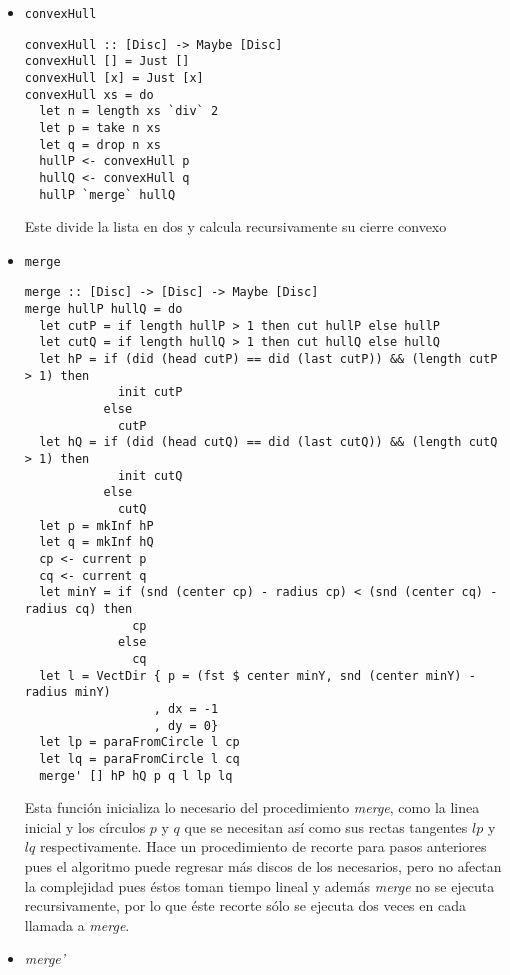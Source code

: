 \documentclass[12pt]{article}
\begin{document}
\begin{itemize}
\item \texttt{convexHull}

  \begin{verbatim}
convexHull :: [Disc] -> Maybe [Disc]
convexHull [] = Just []
convexHull [x] = Just [x]
convexHull xs = do
  let n = length xs `div` 2
  let p = take n xs
  let q = drop n xs
  hullP <- convexHull p
  hullQ <- convexHull q
  hullP `merge` hullQ
  \end{verbatim}

  Este divide la lista en dos y calcula recursivamente su cierre convexo

\item \texttt{merge}

  \begin{verbatim}
merge :: [Disc] -> [Disc] -> Maybe [Disc]
merge hullP hullQ = do
  let cutP = if length hullP > 1 then cut hullP else hullP
  let cutQ = if length hullQ > 1 then cut hullQ else hullQ
  let hP = if (did (head cutP) == did (last cutP)) && (length cutP > 1) then
             init cutP
           else
             cutP
  let hQ = if (did (head cutQ) == did (last cutQ)) && (length cutQ > 1) then
             init cutQ
           else
             cutQ
  let p = mkInf hP
  let q = mkInf hQ
  cp <- current p
  cq <- current q
  let minY = if (snd (center cp) - radius cp) < (snd (center cq) - radius cq) then
               cp
             else
               cq
  let l = VectDir { p = (fst $ center minY, snd (center minY) - radius minY)
                  , dx = -1
                  , dy = 0}
  let lp = paraFromCircle l cp
  let lq = paraFromCircle l cq
  merge' [] hP hQ p q l lp lq
  \end{verbatim}

  Esta función inicializa lo necesario del procedimiento \textit{merge}, como la linea inicial y los círculos $p$ y $q$ que se necesitan así como sus rectas tangentes $lp$ y $lq$ respectivamente. Hace un procedimiento de recorte para pasos anteriores pues el algoritmo puede regresar más discos de los necesarios, pero no afectan la complejidad pues éstos toman tiempo lineal y además \textit{merge} no se ejecuta recursivamente, por lo que éste recorte sólo se ejecuta dos veces en cada llamada a \textit{merge}.

\item \textit{merge'}


\end{itemize}
\end{document}
